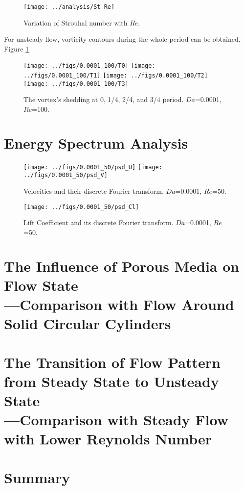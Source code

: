 \begin{figure}
	\centering
	\texttt{[image: ../analysis/St\_Re]}
	\caption{Variation of Strouhal number with $Re$.}
\end{figure}

For unsteady flow, vorticity contours during the whole period can be obtained. Figure \ref{fig: 4*vortex}
\begin{figure}[h]
	\centering
	{\texttt{[image: ../figs/0.0001\_100/T0]}}
	{\texttt{[image: ../figs/0.0001\_100/T1]}}
	{\texttt{[image: ../figs/0.0001\_100/T2]}}
	{\texttt{[image: ../figs/0.0001\_100/T3]}}
	\caption{The vortex's shedding at 0, 1/4, 2/4, and 3/4 period.
		$Da$=0.0001, $Re$=100.}
	\label{fig: 4*vortex}
\end{figure}


\section{Energy Spectrum Analysis} %
\begin{figure}[h]
	\centering
	\texttt{[image: ../figs/0.0001\_50/psd\_U]}
	\texttt{[image: ../figs/0.0001\_50/psd\_V]}
	\caption{Velocities and their discrete Fourier transform. $Da$=0.0001, $Re$=50.}
\end{figure}
\begin{figure}[h]
	\centering
	\texttt{[image: ../figs/0.0001\_50/psd\_Cl]}
	\caption{Lift Coefficient and its discrete Fourier transform. $Da$=0.0001, $Re$=50.}
\end{figure}


\section{The Influence of Porous Media on Flow State\\
	---Comparison with Flow Around Solid Circular Cylinders}
\section{The Transition of Flow Pattern from Steady State to Unsteady State\\
	---Comparison with Steady Flow with Lower Reynolds Number}
\section{Summary}